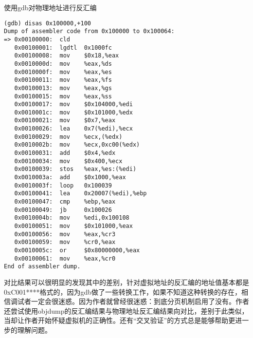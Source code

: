 使用gdb对物理地址进行反汇编
\begin{lstlisting}
(gdb) disas 0x100000,+100
Dump of assembler code from 0x100000 to 0x100064:
=> 0x00100000:  cld
   0x00100001:  lgdtl  0x1000fc
   0x00100008:  mov    $0x18,%eax
   0x0010000d:  mov    %eax,%ds
   0x0010000f:  mov    %eax,%es
   0x00100011:  mov    %eax,%fs
   0x00100013:  mov    %eax,%gs
   0x00100015:  mov    %eax,%ss
   0x00100017:  mov    $0x104000,%edi
   0x0010001c:  mov    $0x101000,%edx
   0x00100021:  mov    $0x7,%eax
   0x00100026:  lea    0x7(%edi),%ecx
   0x00100029:  mov    %ecx,(%edx)
   0x0010002b:  mov    %ecx,0xc00(%edx)
   0x00100031:  add    $0x4,%edx
   0x00100034:  mov    $0x400,%ecx
   0x00100039:  stos   %eax,%es:(%edi)
   0x0010003a:  add    $0x1000,%eax
   0x0010003f:  loop   0x100039
   0x00100041:  lea    0x20007(%edi),%ebp
   0x00100047:  cmp    %ebp,%eax
   0x00100049:  jb     0x100026
   0x0010004b:  mov    %edi,0x100108
   0x00100051:  mov    $0x101000,%eax
   0x00100056:  mov    %eax,%cr3
   0x00100059:  mov    %cr0,%eax
   0x0010005c:  or     $0x80000000,%eax
   0x00100061:  mov    %eax,%cr0
End of assembler dump.
\end{lstlisting}

对比结果可以很明显的发现其中的差别，针对虚拟地址的反汇编的地址值基本都是0xC001****格式的，因为gdb做了一些转换工作，如果不知道这种转换的存在，相信调试者一定会很迷惑。因为作者就曾经很迷惑：到底分页机制启用了没有。作者还尝试使用objdump的反汇编结果与物理地址反汇编结果向对比，差别于此类似，当却让作者开始怀疑虚拟机的正确性。还有“交叉验证”的方式总是能够帮助更进一步的理解问题。
